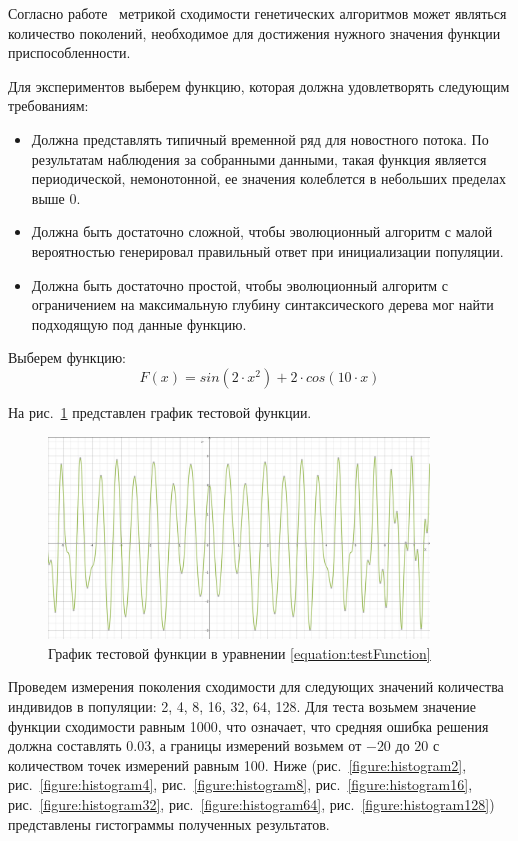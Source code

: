 Согласно работе~\cite{PopulationSize} метрикой сходимости генетических алгоритмов может являться количество поколений, необходимое для достижения нужного значения функции приспособленности.

Для экспериментов выберем функцию, которая должна удовлетворять следующим требованиям:
\begin{itemize}
\item Должна представлять типичный временной ряд для новостного потока. По результатам наблюдения за собранными данными, такая функция является периодической, немонотонной, ее значения колеблется в небольших пределах выше 0.
\item Должна быть достаточно сложной, чтобы эволюционный алгоритм с малой вероятностью генерировал правильный ответ при инициализации популяции.
\item Должна быть достаточно простой, чтобы эволюционный алгоритм с ограничением на максимальную глубину синтаксического дерева мог найти подходящую под данные функцию.
\end{itemize}

Выберем функцию:
\begin{equation}
\label{equation:testFunction}
F(x) = sin (2 \cdot x ^ 2) + 2 \cdot cos (10 \cdot x)
\end{equation}

На рис.~\ref{figure:testFunction} представлен график тестовой функции.

\begin{figure}[h!]
\centering
\includegraphics[width=0.9\textwidth]{science/test_function}
\caption{График тестовой функции в уравнении \ref{equation:testFunction}}
\label{figure:testFunction}
\end{figure}

Проведем измерения поколения сходимости для следующих значений количества индивидов в популяции: 2, 4, 8, 16, 32, 64, 128. Для теста возьмем значение функции сходимости равным 1000, что означает, что средняя ошибка решения должна составлять 0.03, а границы измерений возьмем от $-20$ до $20$ с количеством точек измерений равным 100. Ниже (рис.~\ref{figure:histogram2}, рис.~\ref{figure:histogram4}, рис.~\ref{figure:histogram8}, рис.~\ref{figure:histogram16}, рис.~\ref{figure:histogram32}, рис.~\ref{figure:histogram64}, рис.~\ref{figure:histogram128}) представлены гистограммы полученных результатов.


